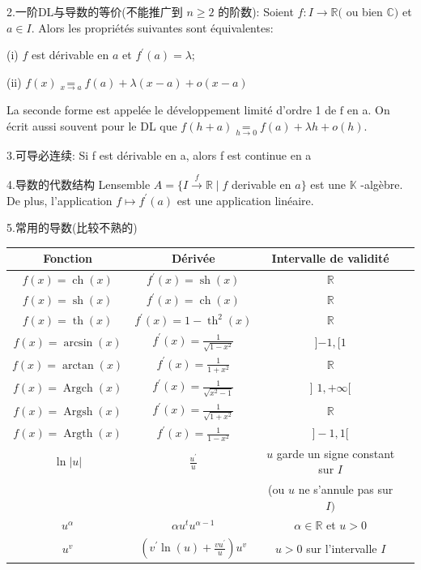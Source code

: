 \documentclass[12pt]{book}
\theoremstyle{definition}\newtheorem{dfn}{Définition}[chapter]
\theoremstyle{plain}\newtheorem{thm}{Théorème}[chapter]
\theoremstyle{plain}\newtheorem{prp}{Proposition}[chapter]
\theoremstyle{plain}\newtheorem{lem}{\bf Lemme}[chapter]
\theoremstyle{plain}\newtheorem{axm}{\bf Axiome}[chapter]
\theoremstyle{plain}\newtheorem{lmm}{\bf Lemme}[chapter]
\theoremstyle{plain}\newtheorem{exm}{\bf Example}[chapter]
\theoremstyle{plain}\newtheorem{cor}{\bf Corollaire}[chapter]
\theoremstyle{remark}\newtheorem{rem}{Remarque}[chapter]
\begin{document}
2.一阶DL与导数的等价(不能推广到 $n \geq 2$ 的阶数):
Soient $f: I \longrightarrow \mathbb{R}($ ou bien $\mathbb{C})$ et $a \in I .$ Alors les propriétés suivantes sont équivalentes:

(i) $f$ est dérivable en $a$ et $f^{\prime}(a)=\lambda$;

(ii) $f(x) \underset{x \rightarrow a}{=} f(a)+\lambda(x-a)+o(x-a)$

La seconde forme est appelée le développement limité d'ordre 1 de $\mathrm{f}$ en a.
On écrit aussi souvent pour le DL que $f(h+a) \underset{h \rightarrow 0}{=} f(a)+\lambda h+o(h)$.

3.可导必连续:
Si f est dérivable en a, alors f est continue en a

4.导数的代数结构
Lensemble $A=\{I \stackrel{f}{\rightarrow} \mathbb{R} \mid f$ derivable en $a\}$ est une $\mathbb{K}$ -algèbre. De plus, l'application $f \longmapsto f^{\prime}(a)$ est une application linéaire.

5.常用的导数(比较不熟的)

\begin{tabular}{|c|c|c|c|}
	\hline Fonction & Dérivée & Intervalle de validité \\
	\hline$f(x)=\operatorname{ch}(x)$ & $f^{\prime}(x)=\operatorname{sh}(x)$ & $\mathbb{R}$ \\
	\hline$f(x)=\operatorname{sh}(x)$ & $f^{\prime}(x)=\operatorname{ch}(x)$ & $\mathbb{R}$ \\
	\hline$f(x)=\operatorname{th}(x)$ & $f^{\prime}(x)=1-\operatorname{th}^{2}(x)$ & $\mathbb{R}$ \\
	\hline$f(x)=\arcsin (x)$ & $f^{\prime}(x)=\frac{1}{\sqrt{1-x^{2}}}$ & ]$-1,[1$ \\
	\hline$f(x)=\arctan (x)$ & $f^{\prime}(x)=\frac{1}{1+x^{2}}$ & $\mathbb{R}$ \\
	\hline$f(x)=\operatorname{Argch}(x)$ & $f^{\prime}(x)=\frac{1}{\sqrt{x^{2}-1}}$ & ] $1,+\infty[$ \\
	\hline$f(x)=\operatorname{Argsh}(x)$ & $f^{\prime}(x)=\frac{1}{\sqrt{1+x^{2}}}$ & $\mathbb{R}$ \\
	\hline$f(x)=\operatorname{Argth}(x)$ & $f^{\prime}(x)=\frac{1}{1-x^{2}}$ & $]-1,1[$\\
	\hline $\ln |u|$ & $\frac{u^{\prime}}{u}$& $u$ garde un signe constant sur $I$ \\&&(ou $u$ ne s'annule pas sur $I)$ \\
	\hline$u^{\alpha}$ & $\alpha u^{t} u^{\alpha-1}$ & $\alpha \in \mathbb{R}$ et $u>0$ \\
	\hline$u^{v}$ & $\left(v^{\prime} \ln (u)+\frac{v u^{\prime}}{u}\right) u^{v}$ & $u>0$ sur l'intervalle $I$ \\
	\hline
	\end{tabular}
\\
\end{document}
